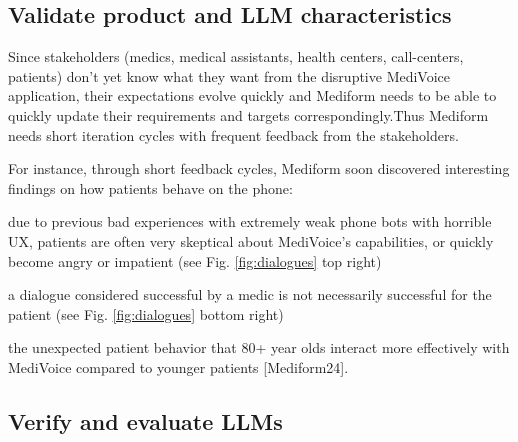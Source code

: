 \documentclass[twocolumn]{article}
\begin{document}
\subsection{Validate product and LLM characteristics}

Since stakeholders (medics, medical assistants, health centers, call-centers, patients) don’t yet know what they want from the disruptive MediVoice application, their expectations evolve quickly and Mediform needs to be able to quickly update their requirements and targets correspondingly.Thus Mediform needs short iteration cycles with frequent feedback from the stakeholders. 

For instance, through short feedback cycles, Mediform soon discovered interesting findings on how patients behave on the phone:
\begin{compactitem}
\item due to previous bad experiences with extremely weak phone bots with horrible UX, patients are often very skeptical about MediVoice’s capabilities, or quickly become angry or impatient  (see Fig. \ref{fig:dialogues} top right)
\item a dialogue considered successful by a medic is not necessarily successful for the patient (see Fig. \ref{fig:dialogues} bottom right)
\item the unexpected patient behavior that 80+ year olds interact more effectively with MediVoice compared to younger patients [Mediform24].
\end{compactitem}

\subsection{Verify and evaluate LLMs}
\end{document}
